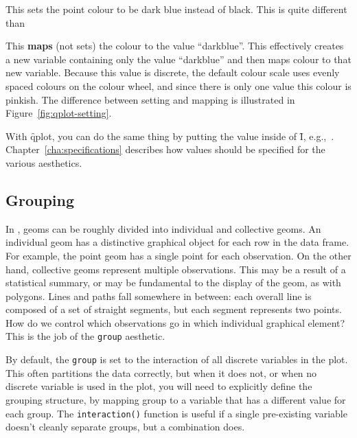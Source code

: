 \noindent This sets the point colour to be dark blue instead of black.  This is quite different than

% 


\noindent This {\bf maps} (not sets) the colour to the value ``darkblue''.  This effectively creates a new variable containing only the value  ``darkblue'' and then maps colour to that new variable.  Because this value is discrete, the default colour scale uses evenly spaced colours on the colour wheel, and since there is only one value this colour is pinkish.  The difference between setting and mapping is illustrated in Figure~\ref{fig:qplot-setting}.  

With \f{qplot}, you can do the same thing by putting the value inside of \f{I}, e.g.,\ .  Chapter~\ref{cha:specifications} describes how values should be specified for the various aesthetics.

% 


\subsection{Grouping}
\label{sub:grouping}

In \ggplot, geoms can be roughly divided into individual and collective geoms.  An individual geom has a distinctive graphical object for each row in the data frame.  For example, the point geom has a single point for each observation.  On the other hand, collective geoms represent multiple observations.  This may be a result of a statistical summary, or may be fundamental to the display of the geom, as with polygons.  Lines and paths fall somewhere in between:  each overall line is composed of a set of straight segments, but each segment represents two points.  How do we control which observations go in which individual graphical element?  This is the job of the {\tt group} aesthetic. 

By default, the {\tt group} is set to the interaction of all discrete variables in the plot.  This often partitions the data correctly, but when it does not, or when no discrete variable is used in the plot, you will need to explicitly define the grouping structure, by mapping group to a variable that has a different value for each group.  The {\tt interaction()} function is useful if a single pre-existing variable doesn't cleanly separate groups, but a combination does.  

